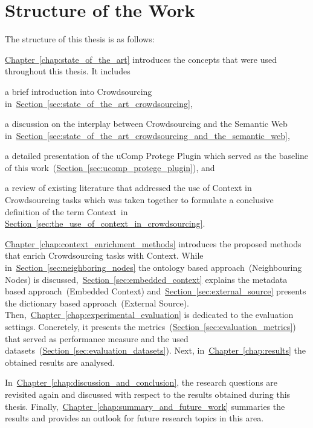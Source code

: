 \section{Structure of the Work}
The structure of this thesis is as follows:

\hyperref[chap:state_of_the_art]{Chapter~\ref*{chap:state_of_the_art}} introduces the concepts that were used throughout this thesis. It includes
\begin{inparaenum}[i)]
		\item a brief introduction into Crowdsourcing in~\hyperref[sec:state_of_the_art_crowdsourcing]{Section~\ref*{sec:state_of_the_art_crowdsourcing}},
		\item a discussion on the interplay between Crowdsourcing and the Semantic Web in~\hyperref[sec:state_of_the_art_crowdsourcing_and_the_semantic_web]{Section~\ref*{sec:state_of_the_art_crowdsourcing_and_the_semantic_web}},
		\item a detailed presentation of the uComp Protege Plugin which served as the baseline of this work~(\hyperref[sec:ucomp_protege_plugin]{Section~\ref*{sec:ucomp_protege_plugin}}), and 
		\item a review of existing literature that addressed the use of Context in Crowdsourcing tasks which was taken together to formulate a conclusive definition of the term \guillemotright Context\guillemotleft~in \hyperref[sec:the_use_of_context_in_crowdsourcing]{Section~\ref*{sec:the_use_of_context_in_crowdsourcing}}.
\end{inparaenum}

\hyperref[chap:context_enrichment_methods]{Chapter~\ref*{chap:context_enrichment_methods}} introduces the proposed methods that enrich Crowdsourcing tasks with Context. While in~\hyperref[sec:neighboring_nodes]{Section~\ref*{sec:neighboring_nodes}} the ontology based approach~(Neighbouring Nodes) is discussed,~\hyperref[sec:embedded_context]{Section~\ref*{sec:embedded_context}} explains the metadata based approach~(Embedded Context) and~\hyperref[sec:external_source]{Section~\ref*{sec:external_source}} presents the dictionary based approach~(External Source). Then,~\hyperref[chap:experimental_evaluation]{Chapter~\ref*{chap:experimental_evaluation}} is dedicated to the evaluation settings. Concretely, it presents the metrics~(\hyperref[sec:evaluation_metrics]{Section~\ref*{sec:evaluation_metrics}}) that served as performance measure and the used
datasets~(\hyperref[sec:evaluation_datasets]{Section~\ref*{sec:evaluation_datasets}}).
Next, in~\hyperref[chap:results]{Chapter~\ref*{chap:results}} the obtained results are analysed.

In~\hyperref[chap:discussion_and_conclusion]{Chapter~\ref*{chap:discussion_and_conclusion}}, the research questions are revisited again and discussed
with respect to the results obtained during this thesis. Finally,~\hyperref[chap:summary_and_future_work]{Chapter~\ref*{chap:summary_and_future_work}}
summaries the results and provides an outlook for future research topics in this area.
